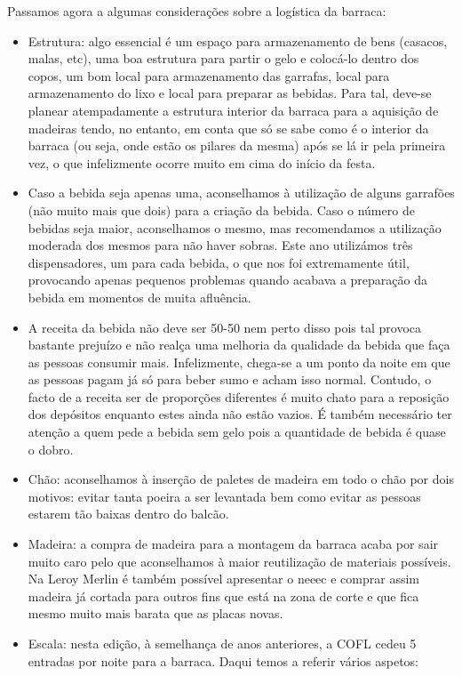 Passamos agora a algumas considerações sobre a logística da barraca:
\begin{itemize}
	\item Estrutura: algo essencial é um espaço para armazenamento de bens (casacos, malas, etc), uma boa estrutura para partir o gelo e colocá-lo dentro dos copos, um bom local para armazenamento das garrafas, local para armazenamento do lixo e local para preparar as bebidas. Para tal, deve-se planear atempadamente a estrutura interior da barraca para a aquisição de madeiras tendo, no entanto, em conta que só se sabe como é o interior da barraca (ou seja, onde estão os pilares da mesma) após se lá ir pela primeira vez, o que infelizmente ocorre muito em cima do início da festa.
    \item Caso a bebida seja apenas uma, aconselhamos à utilização de alguns garrafões (não muito mais que dois) para a criação da bebida. Caso o número de bebidas seja maior, aconselhamos o mesmo, mas recomendamos a utilização moderada dos mesmos para não haver sobras. Este ano utilizámos três dispensadores, um para cada bebida, o que nos foi extremamente útil, provocando apenas pequenos problemas quando acabava a preparação da bebida em momentos de muita afluência.
    \item A receita da bebida não deve ser 50-50 nem perto disso pois tal provoca bastante prejuízo e não realça uma melhoria da qualidade da bebida que faça as pessoas consumir mais. Infelizmente, chega-se a um ponto da noite em que as pessoas pagam já só para beber sumo e acham isso normal. Contudo, o facto de a receita ser de proporções diferentes é muito chato para a reposição dos depósitos enquanto estes ainda não estão vazios. É também necessário ter atenção a quem pede a bebida sem gelo pois a quantidade de bebida é quase o dobro.
    \item Chão: aconselhamos à inserção de paletes de madeira em todo o chão por dois motivos: evitar tanta poeira a ser levantada bem como evitar as pessoas estarem tão baixas dentro do balcão.
    \item Madeira: a compra de madeira para a montagem da barraca acaba por sair muito caro pelo que aconselhamos à maior reutilização de materiais possíveis. Na Leroy Merlin é também possível apresentar o \acrshort{neeec} e comprar assim madeira já cortada para outros fins que está na zona de corte e que fica mesmo muito mais barata que as placas novas.
    \item Escala: nesta edição, à semelhança de anos anteriores, a COFL cedeu 5 entradas por noite para a barraca. Daqui temos a referir vários aspetos:

\end{itemize}

